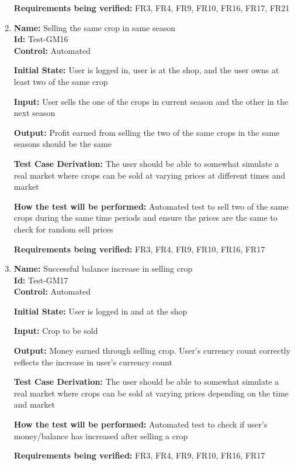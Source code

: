 \documentclass[12pt, titlepage]{article}
\begin{document}
\begin{enumerate}
\textbf{Requirements being verified:} FR3, FR4, FR9, FR10, FR16, FR17, FR21

\item{\textbf{Name:} Selling the same crop in same season\\} %
\textbf{Id:} Test-GM16 \label{Test-GM16}\\

\textbf{Control: }Automated

\textbf{Initial State:} User is logged in, user is at the shop, and the user owns at least two of the same crop

\textbf{Input:} User sells the one of the crops in current season and the other in the next season

\textbf{Output:} Profit earned from selling the two of the same crops in the same seasons should be the same 

\textbf{Test Case Derivation:} The user should be able to somewhat simulate a real market where crops can be sold at varying prices at different times and market

\textbf{How the test will be performed:} Automated test to sell two of the same crops during the same time periods and ensure the prices are the same to check for random sell prices

\textbf{Requirements being verified:} FR3, FR4, FR9, FR10, FR16, FR17

\item{\textbf{Name:} Successful balance increase in selling crop\\} %
\textbf{Id:} Test-GM17 \label{Test-GM17}\\

\textbf{Control:} Automated

\textbf{Initial State:} User is logged in and at the shop

\textbf{Input:} Crop to be sold

\textbf{Output:} Money earned through selling crop. User's currency count correctly reflects the increase in user's currency count

\textbf{Test Case Derivation:} The user should be able to somewhat simulate a real market where crops can be sold at varying prices depending on the time and market

\textbf{How the test will be performed:} Automated test to check if user's money/balance has increased after selling a crop

\textbf{Requirements being verified:} FR3, FR4, FR9, FR10, FR16, FR17


\end{enumerate}
\end{document}
